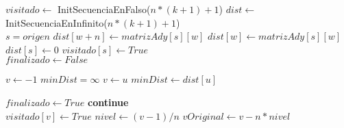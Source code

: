 \begin{algorithm}[H]
\begin{algorithmic}
    
	\State $visitado \gets$ InitSecuenciaEnFalso($n*(k+1)+1$)    
	\State $dist \gets$ InitSecuenciaEnInfinito($n*(k+1)+1$)     \\
	
	\State $s = origen$    
	    
		    
			    
				    
					\State $dist[w+n] \gets matrizAdy[s][w]$    
				\EndIf
			\Else
				\State $dist[w] \gets matrizAdy[s][w]$    
			\EndIf
		\EndIf
	\EndFor \\
	
	\State $dist[s] \gets 0$    
	\State $visitado[s] \gets True$     \\
	
	\State $finalizado \gets False$    
	
	    
		\State $v \gets -1$    
		\State $minDist = \infty$    
		    
			    
				\State $v \gets u$    
				\State $minDist \gets dist[u]$    
			\EndIf
		\EndFor
	
		    
			\State $finalizado \gets True$    
			\State \textbf{continue} 
		\EndIf \\
	
		\State $visitado[v] \gets True$    
		\State $nivel \gets (v-1)/n$    
		\State $vOriginal \gets v - n * nivel$      \\
	

\end{algorithmic}
\end{algorithm}
